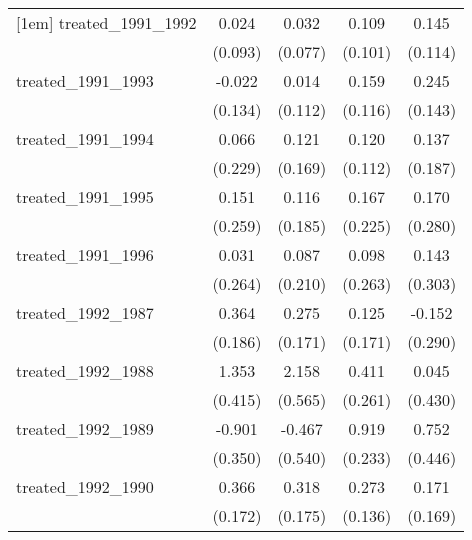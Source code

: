 {\begin{tabular}{l*{4}{c}}
[1em]
treated\_1991\_1992&       0.024         &       0.032         &       0.109         &       0.145         \\
            &     (0.093)         &     (0.077)         &     (0.101)         &     (0.114)         \\
[1em]
treated\_1991\_1993&      -0.022         &       0.014         &       0.159         &       0.245         \\
            &     (0.134)         &     (0.112)         &     (0.116)         &     (0.143)         \\
[1em]
treated\_1991\_1994&       0.066         &       0.121         &       0.120         &       0.137         \\
            &     (0.229)         &     (0.169)         &     (0.112)         &     (0.187)         \\
[1em]
treated\_1991\_1995&       0.151         &       0.116         &       0.167         &       0.170         \\
            &     (0.259)         &     (0.185)         &     (0.225)         &     (0.280)         \\
[1em]
treated\_1991\_1996&       0.031         &       0.087         &       0.098         &       0.143         \\
            &     (0.264)         &     (0.210)         &     (0.263)         &     (0.303)         \\
[1em]
treated\_1992\_1987&       0.364         &       0.275         &       0.125         &      -0.152         \\
            &     (0.186)         &     (0.171)         &     (0.171)         &     (0.290)         \\
[1em]
treated\_1992\_1988&       1.353\sym{**} &       2.158\sym{***}&       0.411         &       0.045         \\
            &     (0.415)         &     (0.565)         &     (0.261)         &     (0.430)         \\
[1em]
treated\_1992\_1989&      -0.901\sym{*}  &      -0.467         &       0.919\sym{***}&       0.752         \\
            &     (0.350)         &     (0.540)         &     (0.233)         &     (0.446)         \\
[1em]
treated\_1992\_1990&       0.366\sym{*}  &       0.318         &       0.273\sym{*}  &       0.171         \\
            &     (0.172)         &     (0.175)         &     (0.136)         &     (0.169)         \\

\end{tabular}}
